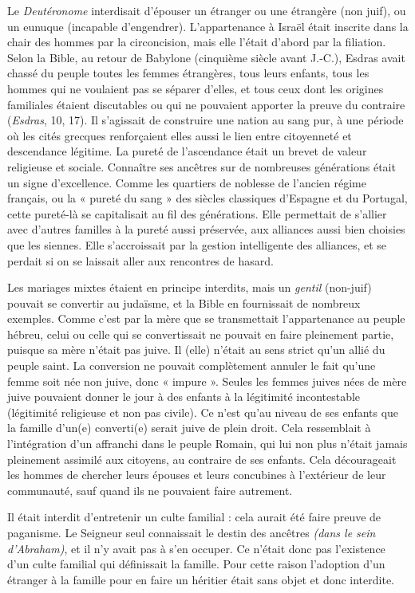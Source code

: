  Le \emph{Deutéronome} interdisait d'épouser un étranger ou une étrangère (non juif), ou un eunuque (incapable d'engendrer). L'appartenance à Israël était inscrite dans la chair des hommes par la circoncision, mais elle l'était d'abord par la filiation. Selon la Bible, au retour de Babylone (cinquième siècle avant J.-C.), Esdras avait chassé du peuple toutes les femmes étrangères, tous leurs enfants, tous les hommes qui ne voulaient pas se séparer d'elles, et tous ceux dont les origines familiales étaient discutables ou qui ne pouvaient apporter la preuve du contraire (\emph{Esdras}, 10, 17). Il s'agissait de construire une nation au sang pur, à une période où les cités grecques renforçaient elles aussi le lien entre citoyenneté et descendance légitime. La pureté de l'ascendance était un brevet de valeur religieuse et sociale. Connaître ses ancêtres sur de nombreuses générations était un signe d'excellence. Comme les quartiers de noblesse de l'ancien régime français, ou la « pureté du sang » des siècles classiques d'Espagne et du Portugal, cette pureté-là se capitalisait au fil des générations. Elle permettait de s'allier avec d'autres familles à la pureté aussi préservée, aux alliances aussi bien choisies que les siennes. Elle s'accroissait par la gestion intelligente des alliances, et se perdait si on se laissait aller aux rencontres de hasard. 

 Les mariages mixtes étaient en principe interdits, mais un \emph{gentil} (non-juif) pouvait se convertir au judaïsme, et la Bible en fournissait de nombreux exemples. Comme c'est par la mère que se transmettait l'appartenance au peuple hébreu, celui ou celle qui se convertissait ne pouvait en faire pleinement partie, puisque sa mère n'était pas juive. Il (elle) n'était au sens strict qu'un allié du peuple saint. La conversion ne pouvait complètement annuler le fait qu'une femme soit née non juive, donc « impure ». Seules les femmes juives nées de mère juive pouvaient donner le jour à des enfants à la légitimité incontestable (légitimité religieuse et non pas civile). Ce n'est qu'au niveau de ses enfants que la famille d'un(e) converti(e) serait juive de plein droit. Cela ressemblait à l'intégration d'un affranchi dans le peuple Romain, qui lui non plus n'était jamais pleinement assimilé aux citoyens, au contraire de ses enfants. Cela décourageait les hommes de chercher leurs épouses et leurs concubines à l'extérieur de leur communauté, sauf quand ils ne pouvaient faire autrement.

 Il était interdit d'entretenir un culte familial : cela aurait été faire preuve de paganisme. Le Seigneur seul connaissait le destin des ancêtres \emph{(dans le sein d'Abraham)}, et il n'y avait pas à s'en occuper. Ce n'était donc pas l'existence d'un culte familial qui définissait la famille. Pour cette raison l'adoption d'un étranger à la famille pour en faire un héritier était sans objet et donc interdite. 

